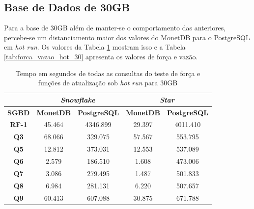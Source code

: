 \subsection{Base de Dados de 30GB}

Para a base de 30GB além de manter-se o comportamento das anteriores, percebe-se um distanciamento maior dos valores do MonetDB para o PostgreSQL em \textit{hot run}. Os valores da Tabela \ref{tab:queries_hot_30} mostram isso e a Tabela \ref{tab:forca_vazao_hot_30} apresenta os valores de força e vazão.

\begin{table}[t]
        \centering
        \caption{Tempo em segundos de todas as consultas do teste de força e funções de atualização sob \textit{hot run} para 30GB}
        \label{tab:queries_hot_30}
        \begin{tabular}{|c|c|c|c|c|} 
                \cline{2-5}
                \multicolumn{1}{c|}{} & \multicolumn{2}{c|}{\textit{\textbf{Snowflake}} } & \multicolumn{2}{c|}{\textit{\textbf{Star}} }  \\ 
                \hline
                 \textbf{SGBD}        & \textbf{MonetDB}  & \textbf{PostgreSQL}           & \textbf{MonetDB}  & \textbf{PostgreSQL}       \\ 
                \hline
                 \textbf{RF-1}        & 45.464            & 4346.899                      & 29.397            & 4011.410                  \\ 
                \hline
                 \textbf{Q3}          & 68.066            & 329.075                       & 57.567            & 553.795                   \\ 
                \hline
                 \textbf{Q5}          & 12.812            & 373.031                       & 12.553            & 537.089                   \\ 
                \hline
                 \textbf{Q6}          & 2.579             & 186.510                       & 1.608             & 473.006                   \\ 
                \hline
                 \textbf{Q7}          & 3.086             & 279.495                       & 1.487             & 501.833                   \\ 
                \hline
                 \textbf{Q8}          & 6.984             & 281.131                       & 6.220             & 507.657                   \\ 
                \hline
                 \textbf{Q9}          & 60.413            & 607.088                       & 30.875            & 671.788                   \\ 

\end{tabular}
\end{table}
